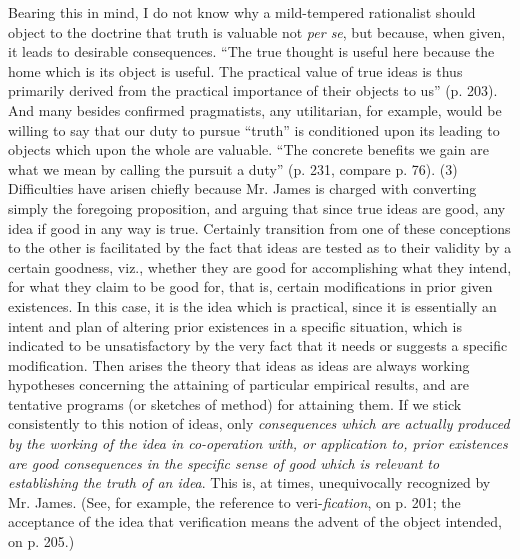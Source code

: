 \documentclass[12pt]{article}
\begin{document}
Bearing this in mind, I do not know why a mild-tempered rationalist
should object to the doctrine that truth is valuable not \emph{per se}, but
because, when given, it leads to desirable consequences. ``The true
thought is useful here because the home which is its object is useful.
The practical value of true ideas is thus primarily derived from the
practical importance of their objects to us'' (p. 203). And many
besides confirmed pragmatists, any utilitarian, for example, would be
willing to say that our duty to pursue ``truth'' is conditioned upon its
leading to objects which upon the whole are valuable. ``The concrete
benefits we gain are what we mean by calling the pursuit a duty'' (p.
231, compare p. 76). (3) Difficulties have arisen chiefly because Mr.
James is charged with converting simply the foregoing proposition, and
arguing that since true ideas are good, any idea if good in any way is
true. Certainly transition from one of these conceptions to the other
is facilitated by the fact that ideas are tested as to their validity
by a certain goodness, viz., whether they are good for accomplishing
what they intend, for what they claim to be good for, that is,
certain modifications in prior given existences. In this case, it is
the idea which is practical, since it is essentially an intent and
plan of altering prior existences in a specific situation, which is
indicated to be unsatisfactory by the very fact that it needs or
suggests a specific modification. Then arises the theory that ideas as
ideas are always working hypotheses concerning the attaining of
particular empirical results, and are tentative programs (or sketches
of method) for attaining them. If we stick consistently to this notion
of ideas, only \emph{consequences which are actually produced by the
working of the idea in co-operation with, or application to, prior
existences are good consequences in the specific sense of good which
is relevant to establishing the truth of an idea}. This is, at times,
unequivocally recognized by Mr. James. (See, for example, the
reference to veri-\emph{fication}, on p. 201; the acceptance of the idea
that verification means the advent of the object intended, on p. 205.)
\end{document}
